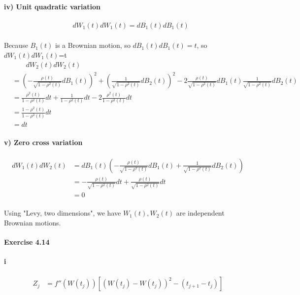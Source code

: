 \documentclass{article}
\begin{document}
\paragraph{iv) Unit quadratic variation}
\begin{align*}
  &dW_1(t)dW_1(t)=dB_1(t)dB_1(t)
\end{align*}
\paragraph{}{Because $B_1(t)$ is a Brownian motion, so $dB_1(t)dB_1(t)=t$, so $dW_1(t)dW_1(t)$=t}
\begin{align*}
  &\quad \quad dW_2(t)dW_2(t) \\ &=(-\frac{\rho(t)}{\sqrt{1-\rho^2(t)}}dB_1(t))^2+(\frac{1}{\sqrt{1-\rho^2(t)}}dB_2(t))^2-2\frac{\rho(t)}{\sqrt{1-\rho^2(t)}}dB_1(t)\frac{1}{\sqrt{1-\rho^2(t)}}dB_2(t) \\
  &=\frac{\rho^2(t)}{1-\rho^2(t)}dt+\frac{1}{1-\rho^2(t)}dt-2\frac{\rho^2(t)}{1-\rho^2(t)}dt\\
  &=\frac{1-\rho^2(t)}{1-\rho^2(t)}dt\\
  &=dt
\end{align*}
\paragraph{v) Zero cross variation}
\begin{align*}
  dW_1(t)dW_2(t)&=dB_1(t)(-\frac{\rho(t)}{\sqrt{1-\rho^2(t)}}dB_1(t)+\frac{1}{\sqrt{1-\rho^2(t)}}dB_2(t))\\
  &=-\frac{\rho(t)}{\sqrt{1-\rho^2(t)}}dt+\frac{\rho(t)}{\sqrt{1-\rho^2(t)}}dt\\
  &=0
\end{align*}
\paragraph{}{Using "Levy, two dimensions", we have $W_1(t),W_2(t)$ are independent Brownian motions.}
\paragraph{Exercise 4.14}
\paragraph{i}
\begin{align*}
  Z_j & =f''(W(t_j))[(W(t_j)-W(t_j))^2-(t_{j+1}-t_j)]
\end{align*}
\end{document}
